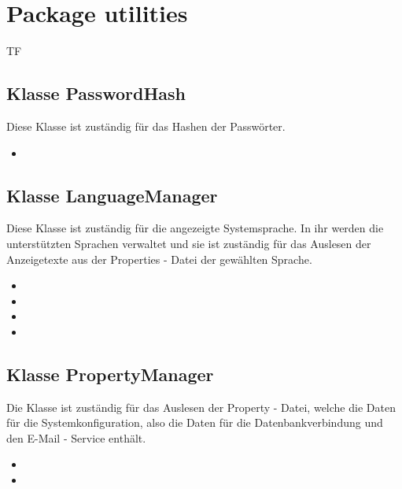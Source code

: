 	
	\section{Package utilities}
	\begin{tiny}
		TF
	\end{tiny}
	\subsection{Klasse PasswordHash}
	Diese Klasse ist zuständig für das Hashen der Passwörter.
	\begin{itemize}
		\item {}
	\end{itemize}
	
	\subsection{Klasse LanguageManager}
	Diese Klasse ist zuständig für die angezeigte Systemsprache. In ihr werden die unterstützten Sprachen verwaltet und sie ist zuständig für das Auslesen der Anzeigetexte aus der Properties - Datei der gewählten Sprache.
	\begin{itemize}
		\item {}
		\item {}
		\item {}
		\item {}
	\end{itemize}
	
	\subsection{Klasse PropertyManager}
	Die Klasse ist zuständig für das Auslesen der Property - Datei, welche die Daten für die Systemkonfiguration, also die Daten für die Datenbankverbindung und den E-Mail - Service enthält.
	\begin{itemize}
		\item {}
		\item {}
	\end{itemize}
	
